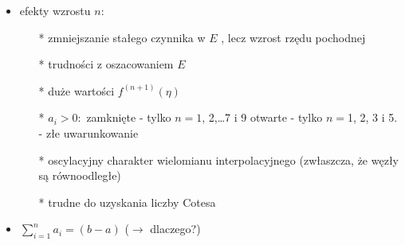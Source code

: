 	\begin{frame}
	\begin{itemize}
		\item efekty wzrostu $n$:
        \begin{itemize}
        	\item[*]  zmniejszanie stałego czynnika w $E$ , lecz wzrost rzędu pochodnej
            \item[*] trudności z oszacowaniem $E$
            \item[*] duże wartości $f^{(n+1)}(\eta)$
            \item[*] $a_{i}>0:$
            zamknięte - tylko $n=1$, 2,\ldots 7 i 9
            otwarte - tylko $n=$1, 2, 3 i 5. - złe uwarunkowanie
            \item[*] oscylacyjny charakter wielomianu interpolacyjnego (zwłaszcza, że
 			węzły są równoodległe)
            \item[*] trudne do uzyskania liczby Cotesa
        \end{itemize}
       \item $\sum_{i=1}^{n}a_{i}=(b-a)$ ($\rightarrow$ dlaczego?)
	\end{itemize}
	\end{frame}






